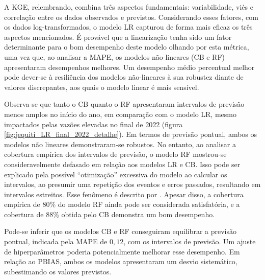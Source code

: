 A KGE, relembrando, combina três aspectos fundamentais: variabilidade, viés e correlação entre os dados observados e previstos. Considerando esses fatores, com os dados log-transformados, o modelo LR capturou de forma mais eficaz os três aspectos mencionados. É provável que a linearização tenha sido um fator determinante para o bom desempenho deste modelo olhando por esta métrica, uma vez que, ao analisar a MAPE, os modelos não-lineares (CB e RF) apresentaram desempenhos melhores. Um desempenho médio percentual melhor pode dever-se à resiliência dos modelos não-lineares à sua robustez diante de valores discrepantes, aos quais o modelo linear é mais sensível.

Observa-se que tanto o CB quanto o RF apresentaram intervalos de previsão menos amplos no início do ano, em comparação com o modelo LR, mesmo impactados pelas vazões elevadas no final de 2022 (figura \ref{fig:jequiti_LR_final_2022_detalhe}). Em termos de previsão pontual, ambos os modelos não lineares demonstraram-se robustos. No entanto, ao analisar a cobertura empírica dos intervalos de previsão, o modelo RF mostrou-se consideravelmente defasado em relação aos modelos LR e CB. Isso pode ser explicado pela possível ``otimização'' excessiva do modelo ao calcular os intervalos, ao presumir uma repetição dos eventos e erros passados, resultando em intervalos estreitos. Esse fenômeno é descrito por \citet{RobHyndman_prediction_intervals}. Apesar disso, a cobertura empírica de $80\%$ do modelo RF ainda pode ser considerada satisfatória, e a cobertura de $88\%$ obtida pelo CB demonstra um bom desempenho.

Pode-se inferir que os modelos CB e RF conseguiram equilibrar a previsão pontual, indicada pela MAPE de $0,12$, com os intervalos de previsão. Um ajuste de hiperparâmetros poderia potencialmente melhorar esse desempenho. Em relação ao PBIAS, ambos os modelos apresentaram um desvio sistemático, subestimando os valores previstos.


